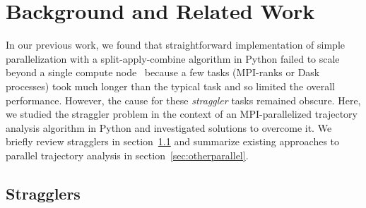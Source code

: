 
\section{Background and Related Work}
\label{sec:background}

In our previous work, we found that straightforward implementation of simple parallelization with a split-apply-combine algorithm in Python failed to scale beyond a single compute node~\cite{Khoshlessan:2017ab} because a few tasks (MPI-ranks or Dask~\cite{Rocklin:2015aa} processes) took much longer than the typical task and so limited the overall performance.
However, the cause for these \emph{straggler} tasks remained obscure.
Here, we studied the straggler problem in the context of an MPI-parallelized trajectory analysis algorithm in Python and investigated solutions to overcome it.
We briefly review stragglers in section~\ref{sec:stragglers} and summarize existing approaches to parallel trajectory analysis in section~\ref{sec:otherparallel}.

\subsection{Stragglers}
\label{sec:stragglers}

